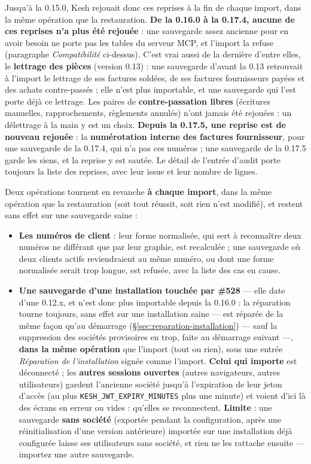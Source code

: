 \documentclass[a4paper,11pt,oneside]{article}
\begin{document}
Jusqu'à la 0.15.0, Kesh rejouait donc ces reprises à la fin de chaque import, dans la même opération que la restauration. \textbf{De la 0.16.0 à la 0.17.4, aucune de ces reprises n'a plus été rejouée} : une sauvegarde assez ancienne pour en avoir besoin ne porte pas les tables du serveur MCP, et l'import la refuse (paragraphe \emph{Compatibilité} ci-dessus). C'est vrai aussi de la dernière d'entre elles, le \textbf{lettrage des pièces} (version 0.13) : une sauvegarde d'avant la 0.13 retrouvait à l'import le lettrage de ses factures soldées, de ses factures fournisseurs payées et des achats contre-passés ; elle n'est plus importable, et une sauvegarde qui l'est porte déjà ce lettrage. Les paires de \textbf{contre-passation libres} (écritures manuelles, rapprochements, règlements annulés) n'ont jamais été rejouées : un délettrage à la main y est un choix. \textbf{Depuis la 0.17.5, une reprise est de nouveau rejouée} : la \textbf{numérotation interne des factures fournisseur}, pour une sauvegarde de la 0.17.4, qui n'a pas ces numéros ; une sauvegarde de la 0.17.5 garde les siens, et la reprise y est sautée. Le détail de l'entrée d'audit  porte toujours la liste des reprises, avec leur issue et leur nombre de lignes.

Deux opérations tournent en revanche \textbf{à chaque import}, dans la même opération que la restauration (soit tout réussit, soit rien n'est modifié), et restent sans effet sur une sauvegarde saine :

\begin{itemize}
    \item \textbf{Les numéros de client} : leur forme normalisée, qui sert à reconnaître deux numéros ne différant que par leur graphie, est recalculée ; une sauvegarde où deux clients actifs reviendraient au même numéro, ou dont une forme normalisée serait trop longue, est refusée, avec la liste des cas en cause.
    \item \textbf{Une sauvegarde d'une installation touchée par \#528} --- elle date d'une 0.12.x, et n'est donc plus importable depuis la 0.16.0 : la réparation tourne toujours, sans effet sur une installation saine --- est réparée de la même façon qu'au démarrage (\S\ref{sec:reparation-installation}) --- sauf la suppression des sociétés provisoires en trop, faite au démarrage suivant ---, \textbf{dans la même opération} que l'import (tout ou rien), sous une entrée \emph{Réparation de l'installation} signée comme l'import. \textbf{Celui qui importe} est déconnecté ; les \textbf{autres sessions ouvertes} (autres navigateurs, autres utilisateurs) gardent l'ancienne société jusqu'à l'expiration de leur jeton d'accès (au plus \texttt{KESH\_JWT\_EXPIRY\_MINUTES} plus une minute) et voient d'ici là des écrans en erreur ou vides : qu'elles se reconnectent. \textbf{Limite} : une sauvegarde \textbf{sans société} (exportée pendant la configuration, après une réinitialisation d'une version antérieure) importée sur une installation déjà configurée laisse ses utilisateurs sans société, et rien ne les rattache ensuite --- importez une autre sauvegarde.
\end{itemize}
\end{document}
